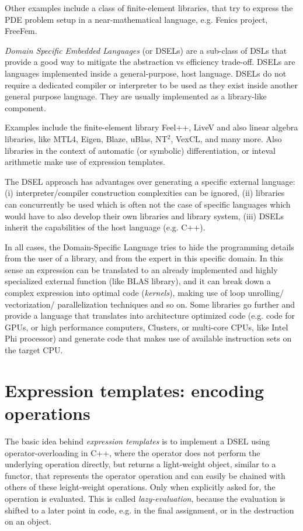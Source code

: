 Other examples include a class of finite-element libraries, that try to express the PDE problem
setup in a near-mathematical language, e.g. Fenics project, FreeFem.

\emph{Domain Specific Embedded Languages} (or DSELs) are a sub-class of DSLs that provide a good way to mitigate the
abstraction vs efficiency trade-off. DSELs are languages implemented inside a general-purpose, host language.
DSELs do not require a dedicated compiler or interpreter to be used as they exist inside another general purpose
language. They are usually implemented as a library-like component.

Examples include the finite-element library \textsf{Feel++}, \textsf{LiveV} and also linear algebra
libraries, like \textsf{MTL4}, \textsf{Eigen}, \textsf{Blaze}, \textsf{uBlas}, \textsf{NT$^2$}, \textsf{VexCL}, and many more.
Also libraries in the context of automatic (or symbolic) differentiation, or inteval arithmetic make use of expression templates.

The DSEL approach has advantages over generating a specific external
language: (i) interpreter/compiler construction complexities can be ignored, (ii) libraries can concurrently be used
which is often not the case of specific languages which would have to also develop their own libraries and library
system, (iii) DSELs inherit the capabilities of the host language (e.g. C++).

In all cases, the Domain-Specific Language tries to hide the programming details from the user of a library, and
from the expert in this specific domain. In this sense an expression can be translated to an already implemented and highly specialized
external function (like BLAS library), and it can break down a complex expression into optimal code (\emph{kernels}), making use of loop
unrolling/ vectorization/ parallelization techniques and so on. Some libraries go further and provide a language
that translates into architecture optimized code (e.g. code for GPUs, or high performance computers, Clusters, or
multi-core CPUs, like Intel Phi processor) and generate code that makes use of available instruction sets on the
target CPU.


\section{Expression templates: encoding operations}
The basic idea behind \emph{expression templates} is to implement a DSEL using operator-overloading in C++, where the operator does not
perform the underlying operation directly, but returns a light-weight object, similar to a functor, that represents the operator operation
and can easily be chained with others of these leight-weight operations. Only when explicitly asked for, the operation is evaluated.
This is called \emph{lazy-evaluation}, because the evaluation is shifted to a later point in code, e.g. in the final assignment, or in the
destruction on an object.

